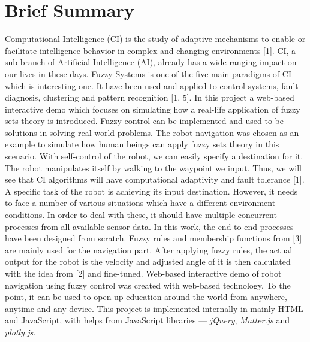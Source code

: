 \documentclass[paper=a4, fontsize=11pt]{scrartcl}
\numberwithin{equation}{section}		%
\numberwithin{figure}{section}			%
\numberwithin{table}{section}				%
\begin{document}
	\section{Brief Summary}
	Computational Intelligence (CI) is the study of adaptive mechanisms to enable or facilitate intelligence behavior in complex and changing environments [1]. CI, a sub-branch of Artificial Intelligence (AI), already has a wide-ranging impact on our lives in these days. Fuzzy Systems is one of the five main paradigms of CI which is interesting one. It have been used and applied to control systems, fault diagnosis, clustering and pattern recognition [1, 5].
	\linebreak \linebreak
	In this project a web-based interactive demo which focuses on simulating how a real-life application of fuzzy sets theory is introduced. Fuzzy control can be implemented and used to be solutions in solving real-world problems. The robot navigation was chosen as an example to simulate how human beings can apply fuzzy sets theory in this scenario. With self-control of the robot, we can easily specify a destination for it. The robot manipulates itself by walking to the waypoint we input. Thus, we will see that CI algorithms will have computational adaptivity and fault tolerance [1].
	\linebreak \linebreak
	A specific task of the robot is achieving its input destination. However, it needs to face a number of various situations which have a different environment conditions. In order to deal with these, it should have multiple concurrent processes from all available sensor data. In this work, the end-to-end processes have been designed from scratch. Fuzzy rules and membership functions from [3] are mainly used for the navigation part. After applying fuzzy rules, the actual output for the robot is the velocity and adjusted angle of it is then calculated with the idea from [2] and fine-tuned.
	\linebreak \linebreak
	Web-based interactive demo of robot navigation using fuzzy control was created with web-based technology. To the point, it can be used to open up education around the world from anywhere, anytime and any device. This project is implemented internally in mainly HTML and JavaScript, with helps from JavaScript libraries --- \textit{jQuery}, \textit{Matter.js} and \textit{plotly.js}.
	
\end{document}
